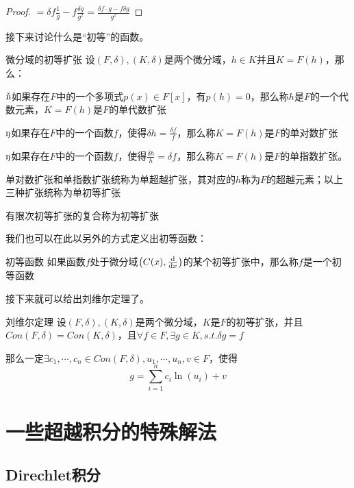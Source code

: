 \documentclass[12pt, a4paper, oneside, UTF8]{ctexbook}
\begin{document}
\begin{para}{0}
\begin{proof}
						$=\delta f \frac{1}{g}-f \frac{\delta g}{g^2} = \frac{\delta f \cdot g - f \delta g}{g^2}$
					\end{proof}
					接下来讨论什么是“初等”的函数。
					\begin{defn}{微分域的初等扩张}{}
						设$(F,\delta),(K,\delta)$是两个微分域，$h \in K$并且$K = F(h)$，那么：
						
						$\ding{172}$如果存在$F$中的一个多项式$p(x) \in F[x]$，有$p(h)=0$，那么称$h$是$F$的一个代数元素，$K=F(h)$是$F$的单代数扩张
						
						$\ding{173}$如果存在$F$中的一个函数$f$，使得$\delta h = \frac{\delta f}{f}$，那么称$K=F(h)$是$F$的单对数扩张
						
						$\ding{173}$如果存在$F$中的一个函数$f$，使得$\frac{\delta h}{h} = \delta f$，那么称$K=F(h)$是$F$的单指数扩张。
						
						单对数扩张和单指数扩张统称为单超越扩张，其对应的$h$称为$F$的超越元素；以上三种扩张统称为单初等扩张
						
						有限次初等扩张的复合称为初等扩张
					\end{defn}
					我们也可以在此以另外的方式定义出初等函数：
					\begin{defn}{初等函数}{}
						如果函数$f$处于微分域$\left(C(x),\frac{\mathrm{d}}{\mathrm{d} x}\right)$的某个初等扩张中，那么称$f$是一个初等函数
					\end{defn}
					接下来就可以给出刘维尔定理了。
					\begin{them}{刘维尔定理}
						设$(F,\delta),(K,\delta)$是两个微分域，$K$是$F$的初等扩张，并且$Con(F,\delta)=Con(K,\delta)$，且$\forall f \in F,\exists g \in K,s.t.\delta g = f$
						
						那么一定$\exists c_1,\cdots,c_n \in Con(F,\delta),u_1,\cdots,u_n,v \in F$，使得
						\begin{equation}
							g = \sum\limits_{i=1}^{n} c_i \ln (u_i)+v
						\end{equation}
					\end{them}
			\end{para}
			
			
	\section{一些超越积分的特殊解法}
		\subsection{Direchlet积分}
		
	
	\ifx\allfiles\undefined
\end{document}
